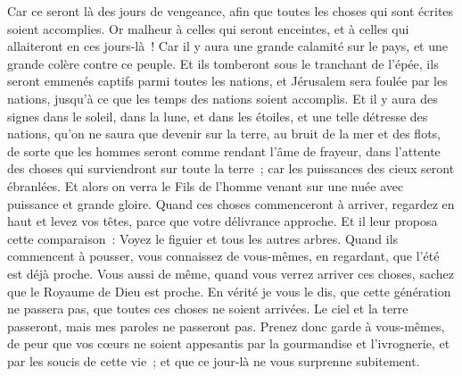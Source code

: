 \begin{multicols}{2}
Car ce seront là des jours de vengeance, afin que toutes les choses qui sont écrites soient accomplies.
Or malheur à celles qui seront enceintes, et à celles qui allaiteront en ces jours-là~! Car il y aura une grande calamité sur le pays, et une grande colère contre ce peuple.
Et ils tomberont sous le tranchant de l'épée, ils seront emmenés captifs parmi toutes les nations, et Jérusalem sera foulée par les nations, jusqu'à ce que les temps des nations soient accomplis.
Et il y aura des signes dans le soleil, dans la lune, et dans les étoiles, et une telle détresse des nations, qu'on ne saura que devenir sur la terre, au bruit de la mer et des flots,
de sorte que les hommes seront comme rendant l'âme de frayeur, dans l'attente des choses qui surviendront sur toute la terre~; car les puissances des cieux seront ébranlées.
Et alors on verra le Fils de l'homme venant sur une nuée avec puissance et grande gloire.
Quand ces choses commenceront à arriver, regardez en haut et levez vos têtes, parce que votre délivrance approche.
Et il leur proposa cette comparaison~: Voyez le figuier et tous les autres arbres.
Quand ils commencent à pousser, vous connaissez de vous-mêmes, en regardant, que l'été est déjà proche.
Vous aussi de même, quand vous verrez arriver ces choses, sachez que le Royaume de Dieu est proche.
En vérité je vous le dis, que cette génération ne passera pas, que toutes ces choses ne soient arrivées.
Le ciel et la terre passeront, mais mes paroles ne passeront pas.
Prenez donc garde à vous-mêmes, de peur que vos cœurs ne soient appesantis par la gourmandise et l'ivrognerie, et par les soucis de cette vie~; et que ce jour-là ne vous surprenne subitement.

\end{multicols}
